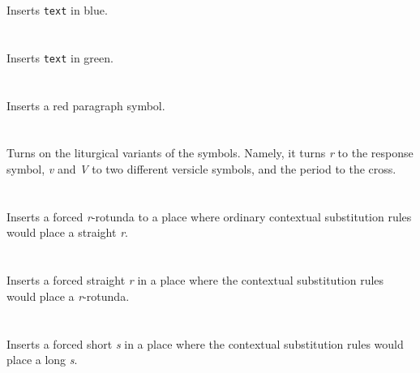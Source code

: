 \documentclass[a4paper, 12pt]{article}
\begin{document}
Inserts \texttt{text} in blue. 

\paragraph{}   \mbox{} \\

Inserts \texttt{text} in green. 

\paragraph{}   \mbox{} \\

Inserts a red paragraph symbol.

\paragraph{}   \mbox{} \\
Turns on the liturgical variants of the symbols. Namely, it turns
\emph{r} to the response symbol, \emph{v} and \emph{V} to two
different versicle symbols, and the period to the cross.

\paragraph{}  \mbox{} \\

Inserts a forced \emph{r}-rotunda to a place where ordinary contextual
substitution rules would place a straight \emph{r}.

\paragraph{}   \mbox{} \\

Inserts a forced straight \emph{r} in a place where the contextual
substitution rules would place a \emph{r}-rotunda.

\paragraph{}   \mbox{} \\

Inserts a forced short \emph{s} in a place where the contextual
substitution rules would place a long \emph{s}.
\end{document}
